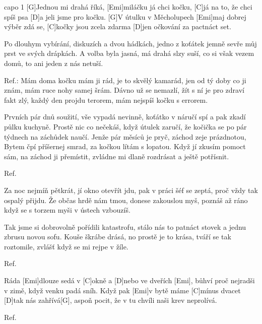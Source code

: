 
capo 1
[G]Jednou mi drahá říká, [Emi]miláčku já chci kočku,
[C]já na to, že chci spíš psa [D]a jeli jsme pro kočku.
[G]V útulku v Měcholupech [Emi]maj dobrej výběr zdá se,
[C]kočky jsou zcela zdarma [D]jen očkování za pactnáct set.

Po dlouhym vybírání, diskuzích a dvou hádkách,
jedno z koťátek jemně sevře můj prst ve svých drápkách.
A volba byla jasná, má drahá slzy suší,
co si však vezem domů, to ani jeden z nás netuší.

Ref.:
Mám doma kočku mám ji rád, je to skvělý kamarád,
jen od tý doby co ji znám, mám ruce nohy samej šrám.
Dávno už se nemazlí, žít s ní je pro zdraví fakt zlý,
každý den projdu terorem, mám nejspíš kočku s errorem.

Prvních pár dnů soužití, vše vypadá nevinně,
koťátko v náručí spí a pak zkadí půlku kuchyně.
Prostě nic co nečekáš, když útulek zaručí,
že kočička se po pár týdnech na záchůdek naučí.
\columnbreak
Jenže pár měsíců je pryč, záchod zeje prázdnotou,
Bytem čpí příšernej smrad, za kočkou lítám s lopatou.
Když jí zkusím pomoct sám, na záchod ji přemístit,
zvládne mi dlaně rozdrásat a ještě potřísnit.

Ref.

Za noc nejmíň pětkrát, jí okno otevřít jdu,
pak v práci šéf se zeptá, proč vždy tak ospalý přijdu.
Že občas hrdě nám tmou, donese zakouslou myš,
poznáš až ráno když se s torzem myši v ústech vzbouzíš.

Tak jsme si dobrovolně pořídili katastrofu,
stálo nás to patnáct stovek a jednu zbrusu novou sofu.
Kouše škrábe drásá, no prostě je to krása,
tváří se tak roztomile, zvlášť když se mi rejpe v žíle.

Ref.

Ráda [Emi]dlouze sedá v [C]okně a [D]nebo ve dveřích [Emi],
bůhví proč nejradši v zimě, když venku padá sníh.
Když pak [Emi]v bytě máme [C]mínus dvacet [D]tak nás zahřívá[G],
aspoň pocit, že v tu chvíli naši krev neprolívá.

Ref.